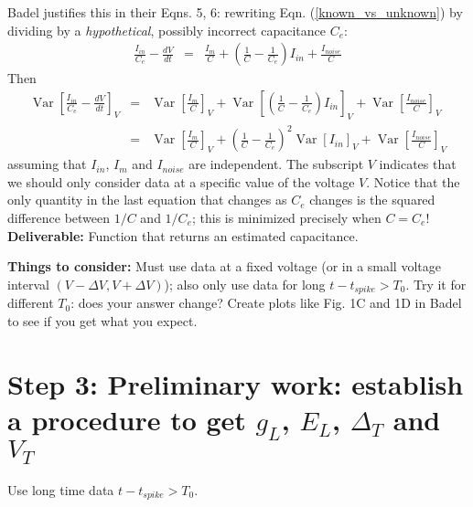 \documentclass[11pt]{article}
\DeclareMathOperator{\Var}{Var}
\begin{document}
Badel justifies this in their Eqns. 5, 6: rewriting Eqn. (\ref{known_vs_unknown}) by dividing by a \textit{hypothetical}, possibly incorrect capacitance $C_e$:
\begin{eqnarray}
\frac{I_{in}}{C_e} - \frac{dV}{dt} & = & \frac{I_m}{C} + \left( \frac{1}{C} - \frac{1}{C_e} \right) I_{in} + \frac{I_{noise}}{C}
\end{eqnarray}
Then 
\begin{eqnarray}
\Var \left[ \frac{I_{in}}{C_e} - \frac{dV}{dt} \right]_V & = & \Var \left[ \frac{I_m}{C}  \right]_V + \Var \left[ \left( \frac{1}{C} - \frac{1}{C_e} \right) I_{in}  \right]_V + \Var \left[ \frac{I_{noise}}{C} \right]_V\\
& = & \Var \left[ \frac{I_m}{C}  \right]_V + \left( \frac{1}{C} - \frac{1}{C_e} \right)^2 \Var \left[ I_{in}  \right]_V + \Var \left[ \frac{I_{noise}}{C} \right]_V
\end{eqnarray}
assuming that $I_{in}$, $I_m$ and $I_{noise}$ are independent. The subscript $V$ indicates that we should only consider data at a specific value of the voltage $V$. Notice that the only quantity in the last equation that changes as $C_e$ changes is the squared difference between $1/C$ and $1/C_e$; this is minimized precisely when $C = C_e$! \\

\noindent
\textbf{Deliverable:} Function that returns an estimated capacitance.

\noindent
\textbf{Things to consider:} Must use data at a fixed voltage (or in a small voltage interval $(V-\Delta V, V+\Delta V)$); also only use data for long $t-t_{spike} > T_0$. Try it for different $T_0$: does your answer change? Create plots like Fig. 1C and 1D in Badel to see if you get what you expect. 


\section*{Step 3: Preliminary work: establish a procedure to get $g_L$, $E_L$, $\Delta_T$ and $V_T$}
 Use long time data $t-t_{spike} > T_0$.

 
%




\end{document}
